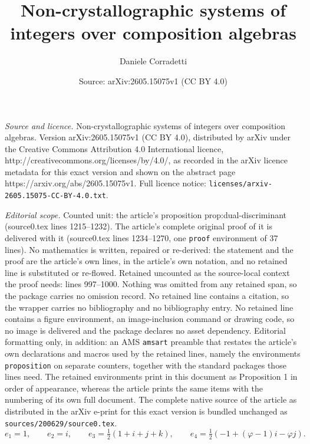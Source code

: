\documentclass[10pt,a4paper]{amsart}
\title{Non-crystallographic systems of integers over composition algebras}
\author{Daniele Corradetti}
\date{Source: arXiv:2605.15075v1 (CC BY 4.0)}
\begin{document}
\maketitle

\noindent\emph{Source and licence.} Non-crystallographic systems of integers over composition algebras. Version arXiv:2605.15075v1 (CC BY 4.0), distributed by arXiv under the Creative Commons Attribution 4.0 International licence, http://creativecommons.org/licenses/by/4.0/, as recorded in the arXiv licence metadata for this exact version and shown on the abstract page https://arxiv.org/abs/2605.15075v1. Full licence notice: \texttt{licenses/arxiv-2605.15075-CC-BY-4.0.txt}.\par\smallskip

\noindent\textit{Editorial scope.} Counted unit: the article's proposition prop:dual-discriminant (source0.tex lines 1215--1232). The article's complete original proof of it is delivered with it (source0.tex lines 1234--1270, one \texttt{proof} environment of 37 lines). No mathematics is written, repaired or re-derived: the statement and the proof are the article's own lines, in the article's own notation, and no retained line is substituted or re-flowed.  Retained uncounted as the source-local context the proof needs: lines 997--1000.  Nothing was omitted from any retained span, so the package carries no omission record.  No retained line contains a citation, so the wrapper carries no bibliography and no bibliography entry.  No retained line contains a figure environment, an image-inclusion command or drawing code, so no image is delivered and the package declares no asset dependency.  Editorial formatting only, in addition: an AMS \texttt{amsart} preamble that restates the article's own declarations and macros used by the retained lines, namely the environments \texttt{proposition} on separate counters, together with the standard packages those lines need.  The retained environments print in this document as Proposition 1 in order of appearance, whereas the article prints the same items with the numbering of its own full document.  The complete native source of the article as distributed in the arXiv e-print for this exact version is bundled unchanged as \texttt{sources/200629/source0.tex}.
\begin{equation}
e_1=1,\qquad e_2=i,\qquad e_3=\tfrac12(1+i+j+k),\qquad e_4=\tfrac12(-1+(\varphi-1)i-\varphi j).
\label{eq:icosian-basis}
\end{equation}
\end{document}
